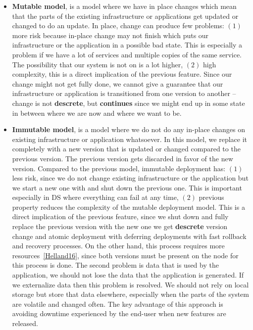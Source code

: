 \begin{itemize}
	\item \textbf{Mutable model}, is a model where we have in place changes which mean that the parts of the existing infrastructure or applications get updated or changed to do an update. In place, change can produce few problems: $(1)$ more risk because in-place change may not finish which puts our infrastructure or the application in a possible bad state. This is especially a problem if we have a lot of services and multiple copies of the same service. The possibility that our system is not on is a lot higher, $(2)$ high complexity, this is a direct implication of the previous feature. Since our change might not get fully done, we cannot give a guarantee that our infrastructure or application is transitioned from one version to another -- change is not \textbf{descrete}, but \textbf{continues} since we might end up in some state in between where we are now and where we want to be.
	\item \textbf{Immutable model}, is a model where we do not do any in-place changes on existing infrastructure or application whatsoever. In this model, we replace it completely with a new version that is updated or changed compared to the previous version. The previous version gets discarded in favor of the new version. Compared to the previous model, immutable deployment has: $(1)$ less risk, since we do not change existing infrastructure or the application but we start a new one with and shut down the previous one. This is important especially in DS where everything can fail at any time, $(2)$ previous property reduces the complexity of the mutable deployment model. This is a direct implication of the previous feature, since we shut down and fully replace the previous version with the new one we get \textbf{descrete} version change and atomic deployment with deferring deployments with fast rollback and recovery processes. On the other hand, this process requires more resources~\ref{Helland16}, since both versions must be present on the node for this process is done. The second problem is data that is used by the application, we should not lose the data that the application is generated. If we externalize data then this problem is resolved. We should not rely on local storage but store that data elsewhere, especially when the parts of the system are volatile and changed often. The key advantage of this approach is avoiding downtime experienced by the end-user when new features are released.
\end{itemize}

